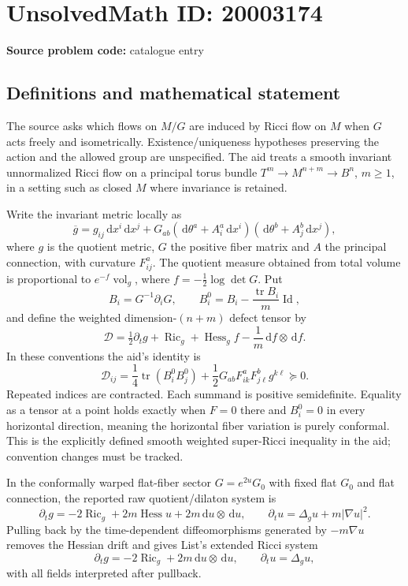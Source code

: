 \documentclass[11pt]{article}
\newcommand{\dd}{\,\mathrm{d}}
\begin{document}
\section*{UnsolvedMath ID: 20003174}
\textbf{Source problem code:} catalogue entry
\subsection{Definitions and mathematical statement}
The source asks which flows on $M/G$ are induced by Ricci flow on $M$ when $G$ acts freely and isometrically. Existence/uniqueness hypotheses preserving the action and the allowed group are unspecified. The aid treats a smooth invariant unnormalized Ricci flow on a principal torus bundle $T^m\to M^{n+m}\to B^n$, $m\geq1$, in a setting such as closed $M$ where invariance is retained.

Write the invariant metric locally as
\[
\overline g=g_{ij}\dd x^i\dd x^j+
G_{ab}(\dd\theta^a+A^a_i\dd x^i)(\dd\theta^b+A^b_j\dd x^j),
\]
where $g$ is the quotient metric, $G$ the positive fiber matrix and $A$ the principal connection, with curvature $F^a_{ij}$. The quotient measure obtained from total volume is proportional to $e^{-f}\operatorname{vol}_g$, where $f=-\tfrac12\log\det G$. Put
\[
B_i=G^{-1}\partial_iG,\qquad B_i^0=B_i-\frac{\operatorname{tr}B_i}{m}\operatorname{Id},
\]
and define the weighted dimension-$(n+m)$ defect tensor by
\[
\mathcal D=\tfrac12\partial_tg+\operatorname{Ric}_g+\operatorname{Hess}_g f-\frac1m\dd f\otimes\dd f.
\]
In these conventions the aid's identity is
\[
\mathcal D_{ij}=\frac14\operatorname{tr}(B_i^0B_j^0)
+\frac12G_{ab}F^a_{ik}F^b_{j\ell}g^{k\ell}\succeq0.
\]
Repeated indices are contracted. Each summand is positive semidefinite. Equality as a tensor at a point holds exactly when $F=0$ there and $B_i^0=0$ in every horizontal direction, meaning the horizontal fiber variation is purely conformal. This is the explicitly defined smooth weighted super-Ricci inequality in the aid; convention changes must be tracked.

In the conformally warped flat-fiber sector $G=e^{2u}G_0$ with fixed flat $G_0$ and flat connection, the reported raw quotient/dilaton system is
\[
\partial_tg=-2\operatorname{Ric}_g+2m\operatorname{Hess}u+2m\dd u\otimes\dd u,
\qquad
\partial_tu=\Delta_gu+m|\nabla u|^2.
\]
Pulling back by the time-dependent diffeomorphisms generated by $-m\nabla u$ removes the Hessian drift and gives List's extended Ricci system
\[
\partial_tg=-2\operatorname{Ric}_g+2m\dd u\otimes\dd u,
\qquad\partial_tu=\Delta_gu,
\]
with all fields interpreted after pullback.
\end{document}
